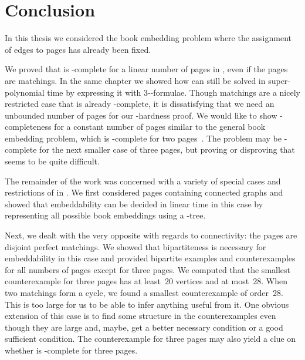 
\chapter{Conclusion}
\label{ch:conclusion}

In this thesis we considered the book
embedding problem where the assignment of edges to pages has already been fixed.

We proved that \probBook is \NP-complete
for a linear number of pages in , even if the pages are matchings. 
In the same chapter we 
showed how \probBook can still be solved in super-polynomial
time by expressing it with 3-\CNF-formulae.
Though matchings are a nicely restricted case that is already \NP-complete, 
it is dissatisfying that we need an unbounded number of pages for our \NP-hardness proof.
We would like to show \NP-completeness for a constant number of pages similar to the general book embedding problem,
which is \NP-complete for two pages~\cite{Bernhart79}. The problem \probBook may be \NP-complete for the next smaller case
of three pages, but proving or disproving that seems to be quite difficult.

The remainder of the work was concerned with a variety of special cases
and restrictions of \probBook in . We first considered pages 
containing connected graphs and
showed that embeddability can be decided in linear time in this case by
representing all possible book embeddings using a \PQ-tree. 

Next, we dealt with the very opposite with regards to connectivity:
the pages are disjoint perfect matchings. We showed that bipartiteness is
necessary for embeddability in this case and provided bipartite examples and counterexamples for
all numbers of pages except for three pages. We computed that the smallest counterexample for three pages has at least~20 vertices
and at most~28. When two matchings form a cycle, we found a smallest
counterexample of order~28. This is too large
for us to be able to infer anything useful from it. One obvious extension of this case is to find some structure
in the counterexamples even though they are large and, maybe, get a better necessary
condition or a good sufficient condition. The counterexample for three pages may also yield a clue on
whether \probBook is \NP-complete for three pages.

